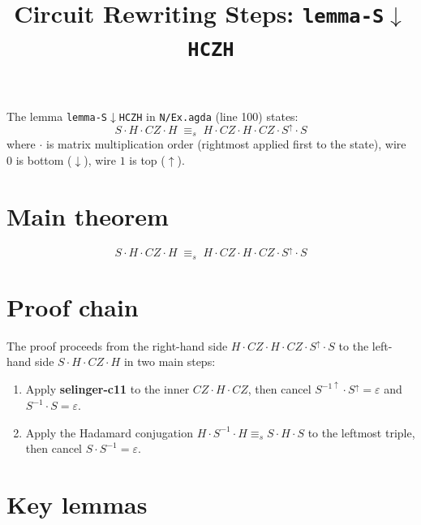 \documentclass[a4paper]{article}
\title{Circuit Rewriting Steps: \texttt{lemma-S$\downarrow$HCZH}}
\date{}
\begin{document}
\maketitle

The lemma \texttt{lemma-S$\downarrow$HCZH} in \texttt{N/Ex.agda} (line 100) states:
\[
  S \cdot H \cdot CZ \cdot H \;\equiv_s\; H \cdot CZ \cdot H \cdot CZ \cdot S^{\uparrow} \cdot S
\]
where $\cdot$ is matrix multiplication order (rightmost applied first to the state), wire $0$ is bottom ($\downarrow$), wire $1$ is top ($\uparrow$).

\section*{Main theorem}

\[
  S \cdot H \cdot CZ \cdot H \;\equiv_s\; H \cdot CZ \cdot H \cdot CZ \cdot S^{\uparrow} \cdot S
\]

\section*{Proof chain}

The proof proceeds from the right-hand side $H \cdot CZ \cdot H \cdot CZ \cdot S^{\uparrow} \cdot S$
to the left-hand side $S \cdot H \cdot CZ \cdot H$ in two main steps:

\begin{enumerate}
  \item Apply \textbf{selinger-c11} to the inner $CZ \cdot H \cdot CZ$, then cancel
        $S^{-1\uparrow} \cdot S^{\uparrow} = \varepsilon$ and $S^{-1} \cdot S = \varepsilon$.
  \item Apply the Hadamard conjugation $H \cdot S^{-1} \cdot H \equiv_s S \cdot H \cdot S$
        to the leftmost triple, then cancel $S \cdot S^{-1} = \varepsilon$.
\end{enumerate}

\bigskip
\begin{center}
\end{center}

\section*{Key lemmas}
\end{document}
